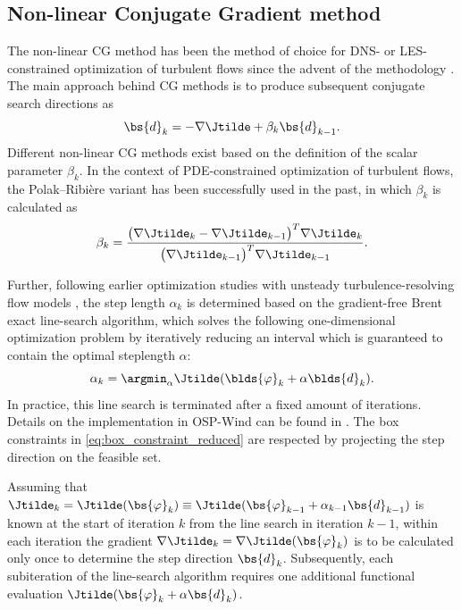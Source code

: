 	\subsection{Non-linear Conjugate Gradient method}\label{sec:problem_cg}
	The non-linear CG method has been the method of choice for DNS- or LES-constrained optimization of turbulent flows since the advent of the methodology \cite{collis2000large, bewley2001dns}. The main approach behind CG methods is to produce subsequent conjugate search directions as
	\begin{equation}
		\bs{d}_k = -\nabla \Jtilde + \beta_k \bs{d}_{k-1}.
	\end{equation}
	Different non-linear CG methods exist based on the definition of the scalar parameter $\beta_k$. In the context of PDE-constrained optimization of turbulent flows, the Polak--Ribi\`ere variant has been successfully used in the past, in which $\beta_k$ is calculated as 
	\begin{equation}
		\beta_k = \frac{ \big( \nabla \Jtilde_k - \nabla \Jtilde_{k-1} \big)^T  \nabla \Jtilde_k}{\big(\nabla \Jtilde_{k-1}\big)^T  \nabla \Jtilde_{k-1}}.
	\end{equation}
	
	Further, following earlier optimization studies with unsteady turbulence-resolving flow models \citep{bewley2001dns, delport2009constrained, goit2015optimal}, the step length $\alpha_k$ is determined based on the gradient-free Brent exact line-search algorithm, which solves the following one-dimensional optimization problem by iteratively reducing an interval which is guaranteed to contain the optimal steplength $\alpha$:
	\begin{equation}
		\alpha_k = \argmin_\alpha{\Jtilde}(\blds{\varphi}_k + \alpha \blds{d}_k).\label{eq:linesearch_exact}
	\end{equation}
	In practice, this line search is terminated after a fixed amount of iterations. Details on the implementation in OSP-Wind can be found in \cite{delport2009constrained}. The box constraints in \eqref{eq:box_constraint_reduced} are respected by projecting the step direction on the feasible set.
	
	Assuming that $\Jtilde_k = \Jtilde(\bs{\varphi}_k) \equiv \Jtilde(\bs{\varphi}_{k-1} + \alpha_{k-1} \bs{d}_{k-1})$ is known at the start of iteration $k$ from the line search in iteration $k-1$, within each iteration the gradient $\nabla \Jtilde_k = \nabla \Jtilde (\bs{\varphi}_k)$ is to be calculated only once to determine the step direction $\bs{d}_k$. Subsequently, each subiteration of the line-search algorithm requires one additional functional evaluation $\Jtilde(\bs{\varphi}_k + \alpha \bs{d}_k)$.

